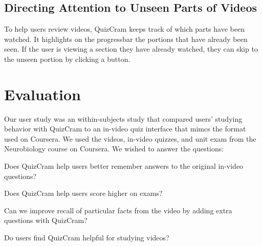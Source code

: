 \documentclass{chi-ext}
\begin{document}
\subsection{Directing Attention to Unseen Parts of Videos}

To help users review videos, QuizCram keeps track of which parts have been watched. It highlights on the progressbar the portions that have already been seen. If the user is viewing a section they have already watched, they can skip to the unseen portion by clicking a button. %


\section{Evaluation}
Our user study was an within-subjects study that compared users' studying behavior with QuizCram to an in-video quiz interface that mimcs the format used on Coursera. We used the videos, in-video quizzes, and unit exam from the Neurobiology course on Coursera. We wished to answer the questions:

\begin{compactitem}
\item Does QuizCram help users better remember answers to the original in-video questions?
\item Does QuizCram help users score higher on exams?
\item Can we improve recall of particular facts from the video by adding extra questions with QuizCram?
\item Do users find QuizCram helpful for studying videos?
\end{compactitem}
\end{document}
